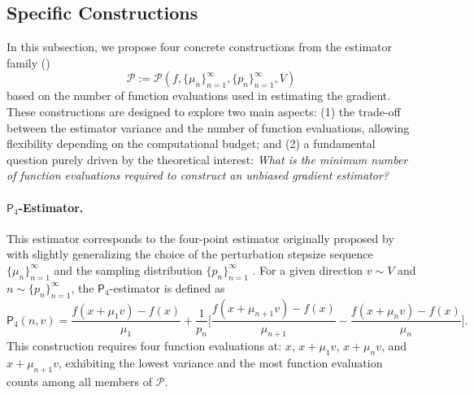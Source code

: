 \documentclass{article}
\theoremstyle{definition}
\theoremstyle{plain}
\theoremstyle{remark}
\begin{document}
\subsection{Specific Constructions}
In this subsection, we propose four concrete  constructions from the estimator family () $$\mathscr{P}:=\mathscr{P}(f, \{ \mu_n\}_{n=1}^\infty, \{ p_n\}_{n=1}^\infty,V)$$ based on the number of function evaluations used in estimating the gradient. These constructions are designed to explore two main aspects: (1) the trade-off between the estimator variance and the number of function evaluations, allowing flexibility depending on the computational budget; and (2) a fundamental question purely driven by the theoretical interest:  \textit{What is the minimum number of function evaluations required to construct an unbiased gradient estimator?}

\paragraph{\(\mathsf{P}_4\)-Estimator.}  
This estimator corresponds to the four-point estimator originally proposed by \citet{chen2020unbiased} with slightly generalizing the choice of the perturbation stepsize sequence $\{\mu_n\}_{n=1}^\infty$ and the sampling distribution $\{p_n\}_{n=1}^\infty$%
. For a given direction $v\sim V$ and $n\sim \{p_n\}_{n=1}^\infty$, the \(\mathsf{P}_4\)-estimator is defined as 
\begin{equation}
\mathsf{P}_4(n, v)= \frac{f(x+\mu_1 v)-f(x)}{\mu_1} + \frac{1}{p_n}\Biggl[ \frac{f(x+\mu_{n+1} v)-f(x)}{\mu_{n+1}} - \frac{f(x+\mu_n v)-f(x)}{\mu_n} \Biggr]. \label{eq:P4_def}
\end{equation}
This construction requires four function evaluations at: $x$, $x+\mu_1 v$, $x+\mu_n v$, and $x+\mu_{n+1}v$, exhibiting the  lowest variance and the most function evaluation counts among all members of $\mathscr{P}$. 
\end{document}
